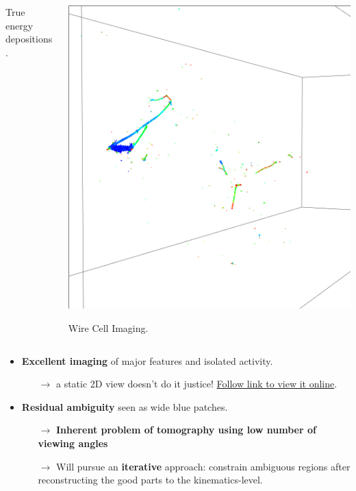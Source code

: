\begin{frame}[fragile]
\begin{columns}
\begin{column}{0.5\textwidth}
\begin{center}
        True energy depositions.
      \end{center}
    \end{column}
    \begin{column}{0.5\textwidth}
      \begin{center}
        \includegraphics[width=\textwidth,trim=3cm 10cm 3cm 10cm,clip]{payoff-reco.png}

        Wire Cell Imaging.
      \end{center}
    \end{column}
  \end{columns}

  \vfill

  \footnotesize
  \begin{itemize}
  \item<2-> \textbf{Excellent imaging} of major features and isolated
    activity.
    \begin{itemize}\scriptsize
    \item[$\rightarrow$] a static 2D view doesn't do it justice!  \href{http://www.phy.bnl.gov/wire-cell/bee/set/6/event/0/}{Follow link to view it online}.
    \end{itemize}
  \item<3-> \textbf{Residual ambiguity} seen as wide blue patches.
    \begin{itemize}\scriptsize
    \item[$\rightarrow$] \textbf{Inherent problem of tomography using low number of viewing angles}
    \item[$\rightarrow$] Will pursue an \textbf{iterative} approach:
      constrain ambiguous regions after reconstructing the good parts
      to the kinematics-level.
    \end{itemize}
  \end{itemize}
\end{frame}


